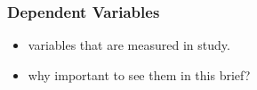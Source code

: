 \subsubsection{Dependent Variables}

\begin{itemize}
	\item variables that are measured in study.
	\item why important to see them in this brief?
\end{itemize}
